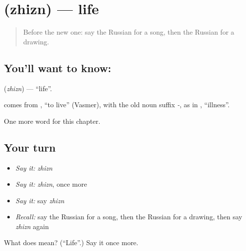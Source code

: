 \section[\texorpdfstring{\ru{жизнь} (zhizn)}{жизнь (zhizn)}]{ (zhizn) — life}

\label{lesson:RU-C113-life}



\begin{quote}
Before the new one: say the Russian for a song, then the Russian for a drawing.
\end{quote}

\subsection*{You'll want to know: }
\textbf{} (\emph{zhizn}) — \textquotedblleft{}life\textquotedblright{}.

\begin{cousinweb}
\textbf{} comes from \emph{}, \textquotedblleft{}to live\textquotedblright{} (Vasmer), with the old noun suffix \emph{-}, as in \emph{}, \textquotedblleft{}illness\textquotedblright{}.
\end{cousinweb}

\begin{grammarlens}[title={What you've built}]
One more word for this chapter.
\end{grammarlens}

\subsection*{Your turn}
\begin{itemize}
\raggedright
  \item \emph{Say it:} \emph{zhizn}
  \item \emph{Say it:} \emph{zhizn}, once more
  \item \emph{Say it:} say \emph{zhizn}
  \item \emph{Recall:} say the Russian for a song, then the Russian for a drawing, then say \emph{zhizn} again
\end{itemize}

\begin{tcolorbox}[breakable,colback=teal!4,colframe=teal!35!black,title={Before you move on}]
What does  mean? (\textquotedblleft{}Life\textquotedblright{}.) Say it once more.
\end{tcolorbox}
